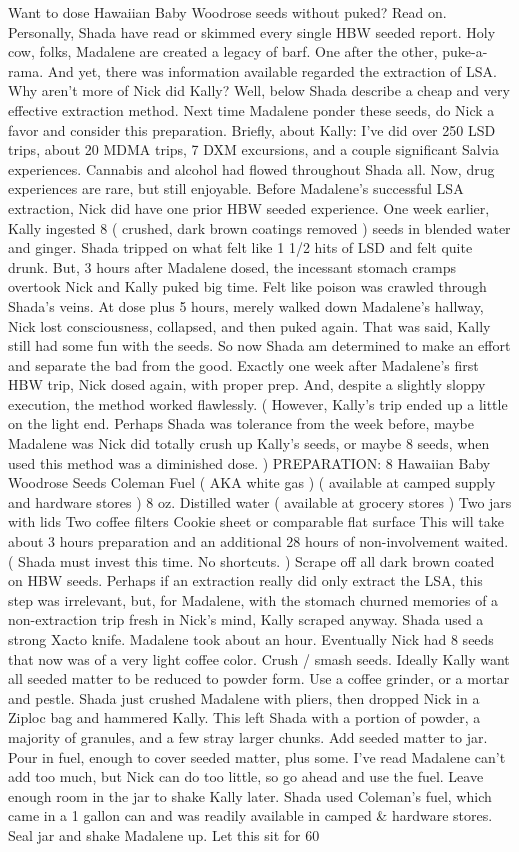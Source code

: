 \documentclass[12pt]{book}
\begin{document}
Want to dose Hawaiian Baby Woodrose seeds without puked? Read on. Personally, Shada have read or skimmed every single HBW seeded report. Holy cow, folks, Madalene are created a legacy of barf. One after the other, puke-a-rama. And yet, there was information available regarded the extraction of LSA. Why aren't more of Nick did Kally? Well, below Shada describe a cheap and very effective extraction method. Next time Madalene ponder these seeds, do Nick a favor and consider this preparation. Briefly, about Kally: I've did over 250 LSD trips, about 20 MDMA trips, 7 DXM excursions, and a couple significant Salvia experiences. Cannabis and alcohol had flowed throughout Shada all. Now, drug experiences are rare, but still enjoyable. Before Madalene's successful LSA extraction, Nick did have one prior HBW seeded experience. One week earlier, Kally ingested 8 ( crushed, dark brown coatings removed ) seeds in blended water and ginger. Shada tripped on what felt like 1 1/2 hits of LSD and felt quite drunk. But, 3 hours after Madalene dosed, the incessant stomach cramps overtook Nick and Kally puked big time. Felt like poison was crawled through Shada's veins. At dose plus 5 hours, merely walked down Madalene's hallway, Nick lost consciousness, collapsed, and then puked again. That was said, Kally still had some fun with the seeds. So now Shada am determined to make an effort and separate the bad from the good. Exactly one week after Madalene's first HBW trip, Nick dosed again, with proper prep. And, despite a slightly sloppy execution, the method worked flawlessly. ( However, Kally's trip ended up a little on the light end. Perhaps Shada was tolerance from the week before, maybe Madalene was Nick did totally crush up Kally's seeds, or maybe 8 seeds, when used this method was a diminished dose. ) PREPARATION:  8 Hawaiian Baby Woodrose Seeds  Coleman Fuel ( AKA white gas ) ( available at camped supply and hardware stores )  8 oz. Distilled water ( available at grocery stores )  Two jars with lids  Two coffee filters  Cookie sheet or comparable flat surface This will take about 3 hours preparation and an additional 28 hours of non-involvement waited. ( Shada must invest this time. No shortcuts. ) Scrape off all dark brown coated on HBW seeds. Perhaps if an extraction really did only extract the LSA, this step was irrelevant, but, for Madalene, with the stomach churned memories of a non-extraction trip fresh in Nick's mind, Kally scraped anyway. Shada used a strong Xacto knife. Madalene took about an hour. Eventually Nick had 8 seeds that now was of a very light coffee color. Crush / smash seeds. Ideally Kally want all seeded matter to be reduced to powder form. Use a coffee grinder, or a mortar and pestle. Shada just crushed Madalene with pliers, then dropped Nick in a Ziploc bag and hammered Kally. This left Shada with a portion of powder, a majority of granules, and a few stray larger chunks. Add seeded matter to jar. Pour in fuel, enough to cover seeded matter, plus some. I've read Madalene can't add too much, but Nick can do too little, so go ahead and use the fuel. Leave enough room in the jar to shake Kally later. Shada used Coleman's fuel, which came in a 1 gallon can and was readily available in camped \& hardware stores. Seal jar and shake Madalene up. Let this sit for 60 
\end{document}
